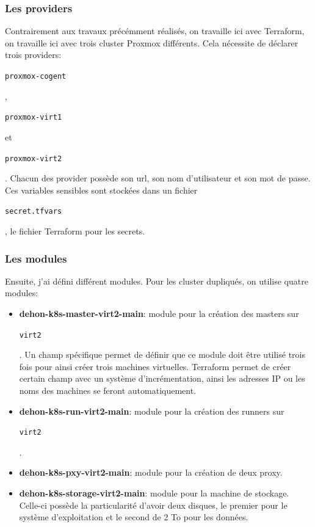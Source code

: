 \documentclass[12pt]{article}
\begin{document}
\subsubsection{Les providers}
Contrairement aux travaux précémment réalisés, on travaille ici avec \gls{Terraform}, on travaille ici avec trois \gls{cluster} \gls{Proxmox} différents.
Cela nécessite de déclarer trois providers: \begin{code}\texttt{proxmox-cogent}\end{code},\begin{code}\texttt{proxmox-virt1}\end{code} et\begin{code}\texttt{proxmox-virt2}\end{code}.
Chacun des provider possède son url, son nom d'utilisateur et son mot de passe.
Ces variables sensibles sont stockées dans un fichier \begin{code}\texttt{secret.tfvars}\end{code}, le fichier \gls{Terraform} pour les secrets.

\subsubsection{Les modules}
Ensuite, j'ai défini différent modules. Pour les \gls{cluster} dupliqués, on utilise quatre modules:
\begin{itemize}
    \item \textbf{dehon-k8s-master-virt2-main}: module pour la création des masters sur \begin{code}\texttt{virt2}\end{code}.
    Un champ spécifique permet de définir que ce module doit être utilisé trois fois pour ainsi créer trois machines virtuelles.
    Terraform permet de créer certain champ avec un système d'incrémentation, ainsi les adresses \gls{IP} ou les noms des machines se feront automatiquement.
    \item \textbf{dehon-k8s-run-virt2-main}: module pour la création des runners sur \begin{code}\texttt{virt2}\end{code}.
    \item \textbf{dehon-k8s-pxy-virt2-main}: module pour la création de deux proxy.
    \item \textbf{dehon-k8s-storage-virt2-main}: module pour la machine de stockage.
    Celle-ci possède la particularité d'avoir deux disques, le premier pour le système d'exploitation et le second de 2 To pour les données.
\end{itemize}
\end{document}
